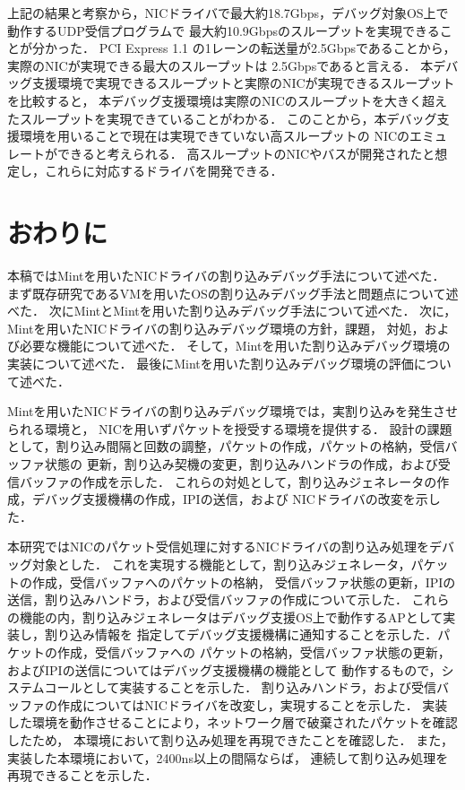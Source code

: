 \documentclass[submit,techreq,noauthor,dvipdfmx]{ipsj}
\begin{document}
上記の結果と考察から，NICドライバで最大約18.7Gbps，デバッグ対象OS上で動作するUDP受信プログラムで
最大約10.9Gbpsのスループットを実現できることが分かった．
PCI Express 1.1 の1レーンの転送量が2.5Gbpsであることから，実際のNICが実現できる最大のスループットは
2.5Gbpsであると言える．
本デバッグ支援環境で実現できるスループットと実際のNICが実現できるスループットを比較すると，
本デバッグ支援環境は実際のNICのスループットを大きく超えたスループットを実現できていることがわかる．
このことから，本デバッグ支援環境を用いることで現在は実現できていない高スループットの
NICのエミュレートができると考えられる．
高スループットのNICやバスが開発されたと想定し，これらに対応するドライバを開発できる．

\section{おわりに}\label{chap:conclusion}

本稿ではMintを用いたNICドライバの割り込みデバッグ手法について述べた．
まず既存研究であるVMを用いたOSの割り込みデバッグ手法と問題点について述べた．
次にMintとMintを用いた割り込みデバッグ手法について述べた．
次に，Mintを用いたNICドライバの割り込みデバッグ環境の方針，課題，
対処，および必要な機能について述べた．
そして，Mintを用いた割り込みデバッグ環境の実装について述べた．
最後にMintを用いた割り込みデバッグ環境の評価について述べた．

Mintを用いたNICドライバの割り込みデバッグ環境では，実割り込みを発生させられる環境と，
NICを用いずパケットを授受する環境を提供する．
設計の課題として，割り込み間隔と回数の調整，パケットの作成，パケットの格納，受信バッファ状態の
更新，割り込み契機の変更，割り込みハンドラの作成，および受信バッファの作成を示した．
これらの対処として，割り込みジェネレータの作成，デバッグ支援機構の作成，IPIの送信，および
NICドライバの改変を示した．

本研究ではNICのパケット受信処理に対するNICドライバの割り込み処理をデバッグ対象とした．
これを実現する機能として，割り込みジェネレータ，パケットの作成，受信バッファへのパケットの格納，
受信バッファ状態の更新，IPIの送信，割り込みハンドラ，および受信バッファの作成について示した．
これらの機能の内，割り込みジェネレータはデバッグ支援OS上で動作するAPとして実装し，割り込み情報を
指定してデバッグ支援機構に通知することを示した．パケットの作成，受信バッファへの
パケットの格納，受信バッファ状態の更新，およびIPIの送信についてはデバッグ支援機構の機能として
動作するもので，システムコールとして実装することを示した．
割り込みハンドラ，および受信バッファの作成についてはNICドライバを改変し，実現することを示した．
実装した環境を動作させることにより，ネットワーク層で破棄されたパケットを確認したため，
本環境において割り込み処理を再現できたことを確認した．
また，実装した本環境において，2400ns以上の間隔ならば，
連続して割り込み処理を再現できることを示した．


\end{document}
